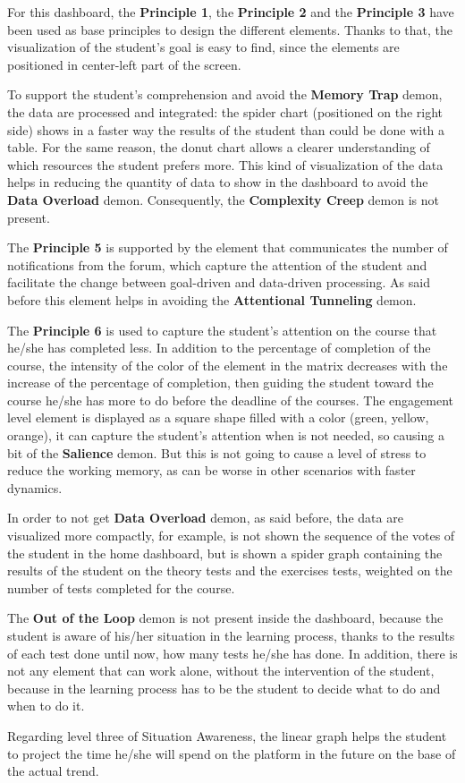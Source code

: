 For this dashboard, the \textbf{Principle 1}, the \textbf{Principle 2} and the \textbf{Principle 3}
have been used as base principles to design the different elements. Thanks to that, the 
visualization of the student's goal is easy to find, since the elements are positioned in center-left
part of the screen. 

To support the student's comprehension and avoid the 
\textbf{Memory Trap} demon, the data are processed and integrated: the spider chart
(positioned on the right side) shows in a faster way the results of the student than
could be done with a table. For the same reason, the donut chart allows a clearer 
understanding of which resources the student prefers more. This kind of visualization of the
data helps in reducing the quantity of data to show in the dashboard to 
avoid the \textbf{Data Overload} demon. Consequently, the \textbf{Complexity Creep} demon is not present.

The \textbf{Principle 5} is supported by the element that communicates the number of 
notifications from the forum, which capture the attention of the student and
facilitate the change between goal-driven and data-driven processing. As said before
this element helps in avoiding the \textbf{Attentional Tunneling} demon.

The \textbf{Principle 6} is used to capture the student's attention on the course that
he/she has completed less. In addition to the percentage of completion of the course,
the intensity of the color of the element in the matrix decreases with the increase
of the percentage of completion, then guiding the student toward the course he/she has more to
do before the deadline of the courses. The engagement level element is displayed as a square
shape filled with a color (green, yellow, orange), it can capture the student's attention when is not needed, so 
causing a bit of the \textbf{Salience} demon. But this is not going to cause a
level of stress to reduce the working memory, as can be worse in other scenarios with 
faster dynamics.

In order to not get \textbf{Data Overload} demon, as said before, the data are visualized
more compactly, for example, is not shown the sequence of the votes of the student in
the home dashboard, but is shown a spider graph containing the results of the student on the
theory tests and the exercises tests, weighted on the number of tests completed for the course.

The \textbf{Out of the Loop} demon is not present inside the dashboard, because
the student is aware of his/her situation in the learning process, thanks to the results of each
test done until now, how many tests he/she has done. In addition, there is not any 
element that can work alone, without the intervention of the student, because in the 
learning process has to be the student to decide what to do and when to do it.

Regarding level three of
Situation Awareness, the linear graph helps the student to project the time he/she will
spend on the platform in the future on the base of the actual trend.


